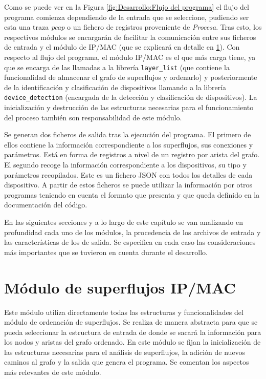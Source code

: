 \documentclass[tfg,epsbased,lof,lot,loa,final,nocopyright,overleaf]{tfgtfmthesisuam}
\begin{document}
Como se puede ver en la Figura \ref{fig:Desarrollo:Flujo del programa} el flujo del programa comienza dependiendo de la entrada que se seleccione, pudiendo ser esta una traza \textit{pcap} o un fichero de registros proveniente de \textit{Procesa}. Tras esto, los respectivos módulos se encargarán de facilitar la comunicación entre sus ficheros de entrada y el módulo de IP/MAC (que se explicará en detalle en \ref{sec:Desarrollo:IPMAC}). Con respecto al flujo del programa, el módulo IP/MAC es el que más carga tiene, ya que se encarga de las llamadas a la librería \texttt{layer\_list} (que contiene la funcionalidad de almacenar el grafo de superflujos y ordenarlo) y posteriormente de la identificación y clasificación de dispositivos llamando a la librería \texttt{device\_detection} (encargada de la detección y clasificación de dispositivos). La inicialización y destrucción de las estructuras necesarias para el funcionamiento del proceso también son responsabilidad de este módulo.

Se generan dos ficheros de salida tras la ejecución del programa. El primero de ellos contiene la información correspondiente a los superflujos, sus conexiones y parámetros. Está en forma de registros a nivel de un registro por arista del grafo. El segundo recoge la información correspondiente a los dispositivos, su tipo y parámetros recopilados. Este es un fichero JSON con todos los detalles de cada dispositivo. A partir de estos ficheros se puede utilizar la información por otros programas teniendo en cuenta el formato que presenta y que queda definido en la documentación del código.

En las siguientes secciones y a lo largo de este capítulo se van analizando en profundidad cada uno de los módulos, la procedencia de los archivos de entrada y las características de los de salida. Se especifica en cada caso las consideraciones más importantes que se tuvieron en cuenta durante el desarrollo.

\section{Módulo de superflujos IP/MAC}
\label{sec:Desarrollo:IPMAC}
Este módulo utiliza directamente todas las estructuras y funcionalidades del módulo de ordenación de superflujos. Se realiza de manera abstracta para que se pueda seleccionar la estructura de entrada de donde se sacará la información para los nodos y aristas del grafo ordenado. En este módulo se fijan la inicialización de las estructuras necesarias para el análisis de superflujos, la adición de nuevos caminos al grafo y la salida que genera el programa. Se comentan los aspectos más relevantes de este módulo.
\end{document}
